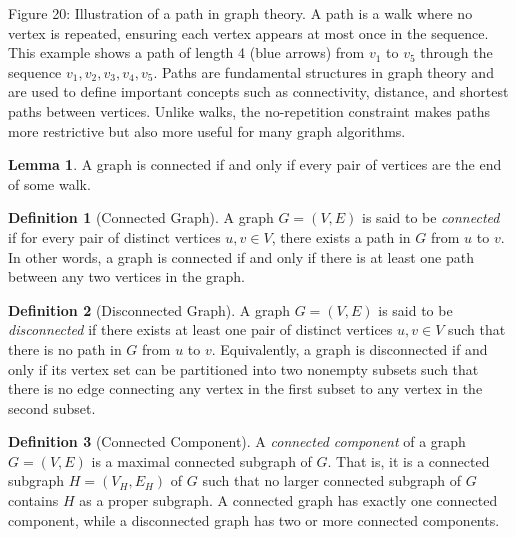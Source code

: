 \documentclass{article}
\theoremstyle{definition}
\newtheorem{lemma}{Lemma}
\newtheorem{definition}{Definition}
\begin{document}
\vspace{0.3cm}
{\centering
\footnotesize Figure 20: Illustration of a path in graph theory. A path is a walk where no vertex is repeated, ensuring each vertex appears at most once in the sequence. This example shows a path of length 4 (blue arrows) from $v_1$ to $v_5$ through the sequence $v_1, v_2, v_3, v_4, v_5$. Paths are fundamental structures in graph theory and are used to define important concepts such as connectivity, distance, and shortest paths between vertices. Unlike walks, the no-repetition constraint makes paths more restrictive but also more useful for many graph algorithms.
\par}

\begin{lemma}
A graph is connected if and only if every pair of vertices are the end of some walk.
\end{lemma}

\begin{definition}[Connected Graph]
A graph $G = (V, E)$ is said to be \textit{connected} if for every pair of distinct vertices $u, v \in V$, there exists a path in $G$ from $u$ to $v$. In other words, a graph is connected if and only if there is at least one path between any two vertices in the graph.
\end{definition}

\begin{definition}[Disconnected Graph]
A graph $G = (V, E)$ is said to be \textit{disconnected} if there exists at least one pair of distinct vertices $u, v \in V$ such that there is no path in $G$ from $u$ to $v$. Equivalently, a graph is disconnected if and only if its vertex set can be partitioned into two nonempty subsets such that there is no edge connecting any vertex in the first subset to any vertex in the second subset.
\end{definition}

\begin{definition}[Connected Component]
A \textit{connected component} of a graph $G = (V, E)$ is a maximal connected subgraph of $G$. That is, it is a connected subgraph $H = (V_H, E_H)$ of $G$ such that no larger connected subgraph of $G$ contains $H$ as a proper subgraph. A connected graph has exactly one connected component, while a disconnected graph has two or more connected components.
\end{definition}
\end{document}
